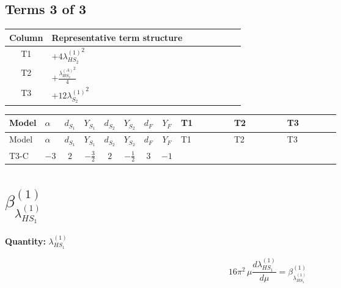 \documentclass[8pt]{article}
\begin{document}
\begin{landscape}
\subsection*{Terms 3 of 3}
\begin{center}
\begin{tabular}{@{}c >{\raggedright\arraybackslash}p{0.82\linewidth}@{}}
\toprule
Column & Representative term structure \\
\midrule
T1 & \(\displaystyle +4 {\lambda_{HS_2}^{(1)}}^2\) \\
\midrule
T2 & \(\displaystyle +\frac{{\lambda_{HS_2}^{(A)}}^2}{4}\) \\
\midrule
T3 & \(\displaystyle +12 {\lambda_{S_2}^{(1)}}^2\) \\
\midrule
\bottomrule
\end{tabular}
\end{center}
\smallskip
\tiny
\begin{longtable}{@{}llcccccc >{\raggedright\arraybackslash}p{0.21\linewidth} >{\raggedright\arraybackslash}p{0.21\linewidth} >{\raggedright\arraybackslash}p{0.21\linewidth}@{}}
\toprule
Model & $\alpha$ & $d_{S_1}$ & $Y_{S_1}$ & $d_{S_2}$ & $Y_{S_2}$ & $d_F$ & $Y_F$ & T1 & T2 & T3 \\
\midrule
\endfirsthead
\toprule
Model & $\alpha$ & $d_{S_1}$ & $Y_{S_1}$ & $d_{S_2}$ & $Y_{S_2}$ & $d_F$ & $Y_F$ & T1 & T2 & T3 \\
\midrule
\endhead
T3-C & $-3$ & $2$ & $-\frac{3}{2}$ & $2$ & $-\frac{1}{2}$ & $3$ & $-1$ & \scriptsize\adjustbox{max width=\linewidth}{$\begin{gathered} +4 {\lambda_{HS_2}^{(1)}}^2\end{gathered}$} & \scriptsize\adjustbox{max width=\linewidth}{$\begin{gathered} +\frac{{\lambda_{HS_2}^{(A)}}^2}{4}\end{gathered}$} & \scriptsize\adjustbox{max width=\linewidth}{$\begin{gathered} +12 {\lambda_{S_2}^{(1)}}^2\end{gathered}$} \\
\midrule
\bottomrule
\end{longtable}
\clearpage
\section*{$\beta_{\lambda_{HS_1}^{(1)}}^{(1)}$}
\noindent\textbf{Quantity: }$\lambda_{HS_1}^{(1)}$\par\smallskip
\[16\pi^2\,\mu\frac{d \lambda_{HS_1}^{(1)}}{d\mu}=\beta_{\lambda_{HS_1}^{(1)}}^{(1)}\]

\end{landscape}
\end{document}

